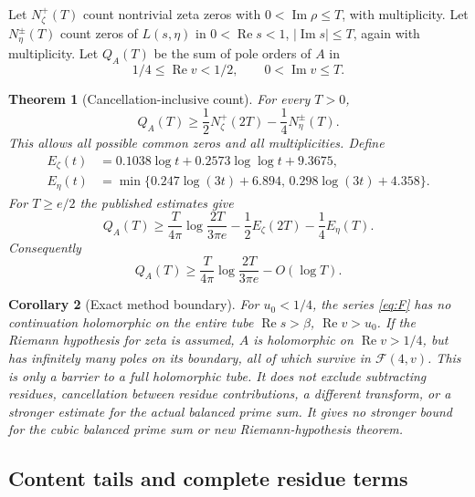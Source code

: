 \documentclass[11pt]{article}
\numberwithin{equation}{section}
\newcommand{\F}{\mathcal F}
\newcommand{\Rea}{\operatorname{Re}}
\newcommand{\Ima}{\operatorname{Im}}
\newtheorem{theorem}{Theorem}[section]
\newtheorem{corollary}[theorem]{Corollary}
\begin{document}
Let $N_\zeta^+(T)$ count nontrivial zeta zeros with
$0<\Ima\rho\le T$, with multiplicity. Let $N_\eta^{\pm}(T)$ count
zeros of $L(s,\eta)$ in $0<\Rea s<1$, $|\Ima s|\le T$, again with
multiplicity. Let $Q_A(T)$ be the sum of pole orders of $A$ in
\begin{equation}\label{eq:region}
 1/4\le\Rea v<1/2,\qquad 0<\Ima v\le T.
\end{equation}

\begin{theorem}[Cancellation-inclusive count]\label{thm:count}
For every $T>0$,
\begin{equation}\label{eq:count}
 Q_A(T)\ge\frac12N_\zeta^+(2T)-\frac14N_\eta^{\pm}(T).
\end{equation}
This allows all possible common zeros and all multiplicities.
Define
\begin{align}
 E_\zeta(t)&=0.1038\log t+0.2573\log\log t+9.3675,\label{eq:Ez}\\
 E_\eta(t)&=\min\{0.247\log(3t)+6.894,\,
                      0.298\log(3t)+4.358\}.\label{eq:Eeta}
\end{align}
For $T\ge e/2$ the published estimates give
\begin{equation}\label{eq:explicit}
 Q_A(T)\ge\frac{T}{4\pi}\log\frac{2T}{3\pi e}
          -\frac12E_\zeta(2T)-\frac14E_\eta(T).
\end{equation}
Consequently
\begin{equation}\label{eq:asymp}
 Q_A(T)\ge\frac{T}{4\pi}\log\frac{2T}{3\pi e}-O(\log T).
\end{equation}
\end{theorem}

\begin{corollary}[Exact method boundary]\label{cor:barrier}
For $u_0<1/4$, the series \eqref{eq:F} has no continuation
holomorphic on the entire tube $\Rea s>\beta$, $\Rea v>u_0$.
If the Riemann hypothesis for zeta is assumed, $A$ is holomorphic
on $\Rea v>1/4$, but has infinitely many poles on its boundary,
all of which survive in $\F(4,v)$. This is only a barrier to a full
holomorphic tube. It does not exclude subtracting residues,
cancellation between residue contributions, a different transform,
or a stronger estimate for the actual balanced prime sum. It gives
no stronger bound for the cubic balanced prime sum or new Riemann-hypothesis theorem.
\end{corollary}


\subsection{Content tails and complete residue terms}
\end{document}
